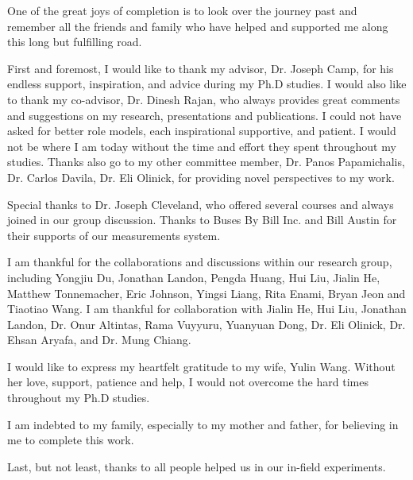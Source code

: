 One of the great joys of completion is to look over the journey past and remember
all the friends and family who have helped and supported me along this long but 
fulfilling road. 

First and foremost, I would like to thank my advisor, Dr. Joseph Camp, 
for his endless support, inspiration, and advice during my Ph.D studies. 
I would also like to thank my co-advisor, Dr. Dinesh Rajan, who always 
provides great comments and suggestions on my research, presentations 
and publications. I could not have asked for better role models, each 
inspirational supportive, and patient.
I would not be where I am today without the time and effort they spent throughout my 
studies. 
Thanks also go to my other committee member, Dr. Panos Papamichalis, 
Dr. Carlos Davila, Dr. Eli Olinick, for providing novel perspectives to my work.

Special thanks to Dr. Joseph Cleveland, who offered several courses and always joined in 
our group discussion. Thanks to Buses By Bill Inc. and Bill Austin for their supports of 
our measurements system.

I am thankful for the collaborations and discussions within our research group, 
including Yongjiu Du, Jonathan Landon, Pengda Huang, Hui Liu, Jialin He, Matthew Tonnemacher, 
Eric Johnson, Yingsi Liang, Rita Enami, Bryan Jeon and Tiaotiao Wang. I am thankful for collaboration 
with Jialin He, Hui Liu, Jonathan Landon, Dr. Onur Altintas, Rama Vuyyuru, 
Yuanyuan Dong, Dr. Eli Olinick, Dr. Ehsan Aryafa, and Dr. Mung Chiang.



I would like to express my heartfelt gratitude to my wife, Yulin Wang. Without her love, 
support, patience and help, I would not overcome the hard times throughout my Ph.D studies.

I am indebted to my family, especially to my mother and father, for 
believing in me to complete this work.

Last, but not least, thanks to all people helped us in our in-field experiments.



